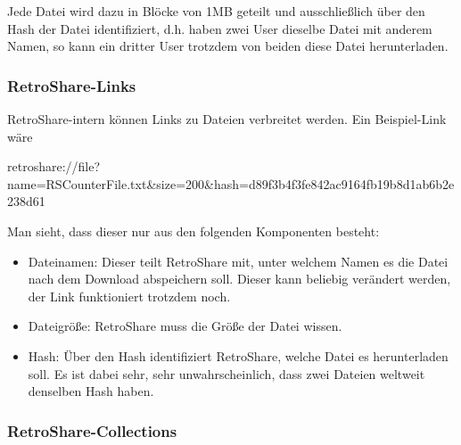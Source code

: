 Jede Datei wird dazu in Blöcke von 1MB geteilt und ausschließlich über den Hash der Datei identifiziert, d.h. haben zwei User dieselbe Datei mit anderem Namen, so kann ein dritter User trotzdem von beiden diese Datei herunterladen.

\subsubsection{RetroShare-Links}

RetroShare-intern können Links zu Dateien verbreitet werden. Ein Beispiel-Link wäre

retroshare://file?{\color{green}name=RSCounterFile.txt}\&{\color{yellow}size=200}\&{\color{red}hash=d89f3b4f3fe842ac9164fb19b8d1ab6b2e238d61}

Man sieht, dass dieser nur aus den folgenden Komponenten besteht:
\begin{itemize}
 \item {\color{green}Dateinamen}: Dieser teilt RetroShare mit, unter welchem Namen es die Datei nach dem Download abspeichern soll. Dieser kann beliebig verändert werden, der Link funktioniert trotzdem noch.
 \item {\color{yellow}Dateigröße}: RetroShare muss die Größe der Datei wissen.
 \item {\color{red}Hash}: Über den Hash identifiziert RetroShare, welche Datei es herunterladen soll. Es ist dabei sehr, sehr unwahrscheinlich, dass zwei Dateien weltweit denselben Hash haben.
\end{itemize}

\subsubsection{RetroShare-Collections} \label{rscollection}

